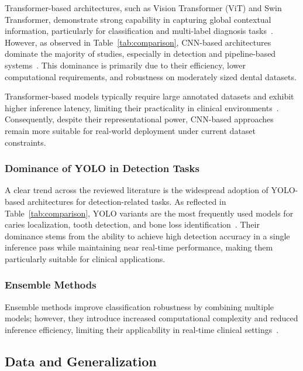 \documentclass[conference]{IEEEtran}
\begin{document}
Transformer-based architectures, such as Vision Transformer (ViT) and Swin Transformer, demonstrate strong capability in capturing global contextual information, particularly for classification and multi-label diagnosis tasks~\cite{vannistelrooij2024combining}. However, as observed in Table~\ref{tab:comparison}, CNN-based architectures dominate the majority of studies, especially in detection and pipeline-based systems~\cite{kaushik2025densenet201}. This dominance is primarily due to their efficiency, lower computational requirements, and robustness on moderately sized dental datasets.

Transformer-based models typically require large annotated datasets and exhibit higher inference latency, limiting their practicality in clinical environments~\cite{vannistelrooij2024combining}. Consequently, despite their representational power, CNN-based approaches remain more suitable for real-world deployment under current dataset constraints.

\subsubsection{Dominance of YOLO in Detection Tasks}

A clear trend across the reviewed literature is the widespread adoption of YOLO-based architectures for detection-related tasks. As reflected in Table~\ref{tab:comparison}, YOLO variants are the most frequently used models for caries localization, tooth detection, and bone loss identification~\cite{nassiri2025yolo}. Their dominance stems from the ability to achieve high detection accuracy in a single inference pass while maintaining near real-time performance, making them particularly suitable for clinical applications.

\subsubsection{Ensemble Methods}

Ensemble methods improve classification robustness by combining multiple models; however, they introduce increased computational complexity and reduced inference efficiency, limiting their applicability in real-time clinical settings~\cite{gamal2025automated}.

\subsection{Data and Generalization}
\end{document}

